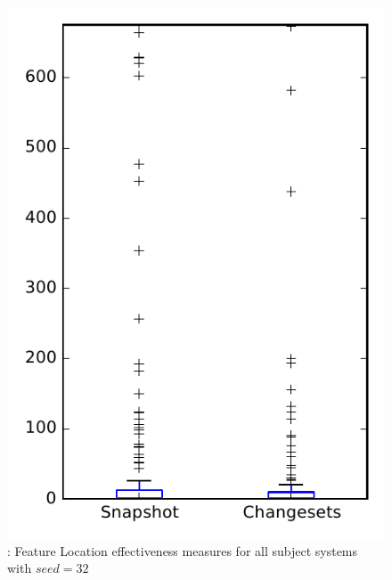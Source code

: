 
\begin{figure}
\centering
\includegraphics[height=0.4\textheight]{figures/flt_seed/rq1_overview_32}
\caption{\rone: Feature Location effectiveness measures for all subject systems with $seed=32$}
\label{fig:flt_seed:rq1:overview}
\end{figure}
